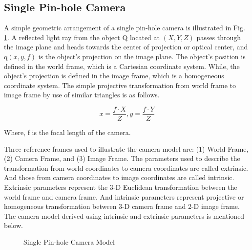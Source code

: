 \subsection{Single Pin-hole Camera}
A simple geometric arrangement of a single pin-hole camera is illustrated in Fig. \ref{pinhole}. A reflected light ray from the object Q located at $(X, Y, Z)$ passes through the image plane and heads towards the center of projection or optical center, and q$(x,y,f)$  is the object's projection on the image plane. The object's position is defined in the world frame, which is a Cartesian coordinate system. While, the object's projection is defined in the image frame, which is a homogeneous coordinate system. The simple projective transformation from world frame to image frame by use of similar triangles is as follows.
 
\begin{equation}
x =  \frac{f \cdot X}{Z} , y = \frac{f \cdot Y}{Z} 
\label{eq21}
\end{equation}

Where, f is the focal length of the camera. 
 
Three reference frames used to illustrate the camera model are: (1) World Frame, (2) Camera Frame, and (3) Image Frame. The parameters used to describe the transformation from world coordinates to camera coordinates are called extrinsic. And those from camera coordinates to image coordinates are called intrinsic. Extrinsic parameters represent the 3-D Euclidean transformation between the world frame and camera frame. And intrinsic parameters represent projective or homogeneous transformation between 3-D camera frame and 2-D image frame. The camera model derived using intrinsic and extrinsic parameters is mentioned below.       

\begin{figure}
    \centering
    \caption{Single Pin-hole Camera Model \cite{opencv}}
    \label{pinhole}
\end{figure}

